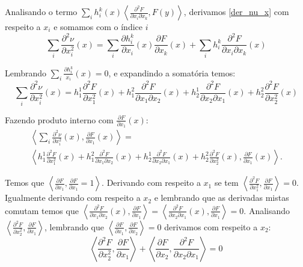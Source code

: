 \begin{demonstracao}
	Analisando o termo $\sum_i h_i^k(x) \left\langle \frac{\partial^2 F}{\partial x_i \partial x_k}, F(y) \right\rangle$, derivamos \ref{der_nu_x} com respeito a $x_i$ e somamos com o índice $i$
	\begin{equation*}
		\sum_i \frac{\partial^2 \nu}{\partial x_i^2}(x) = \sum_i \frac{\partial h_i^k}{\partial x_i}(x) \frac{\partial F}{\partial x_k}(x) + \sum_i h_i^k \frac{\partial^2 F}{\partial x_i \partial x_k}(x)
	\end{equation*}
	
	Lembrando $\sum_i \frac{\partial h_i^k}{x_i}(x) = 0$, e expandindo a somatória  temos:
	\begin{equation*}
		\sum_i \frac{\partial^2 \nu}{\partial x_i^2}(x) =  h_1^1 \frac{\partial^2 F}{\partial x_1^2}(x) + h_1^2 \frac{\partial^2 F}{\partial x_1 \partial x_2}(x) + h_2^1 \frac{\partial^2 F}{\partial x_2 \partial x_1}(x) + h_2^2 \frac{\partial^2 F}{\partial x_2^2}(x)
	\end{equation*}
	
	Fazendo produto interno com $\frac{\partial F}{\partial x_1}(x)$:
	\begin{multline*}
		\left\langle \sum_i \frac{\partial^2 \nu}{\partial x_i^2}(x), \frac{\partial F}{\partial x_1}(x) \right\rangle =\\
		\left\langle h_1^1 \frac{\partial^2 F}{\partial x_1^2}(x) + h_1^2 \frac{\partial^2 F}{\partial x_1 \partial x_2}(x) + h_2^1 \frac{\partial^2 F}{\partial x_2 \partial x_1}(x) + h_2^2 \frac{\partial^2 F}{\partial x_2^2}(x), \frac{\partial F}{\partial x_1}(x) \right\rangle.
	\end{multline*}
	
	Temos que $\left\langle \frac{\partial F}{\partial x_1}, \frac{\partial F}{\partial x_1} = 1 \right\rangle$. Derivando com respeito a $x_1$ se tem $\left\langle \frac{\partial^2 F}{\partial x_1^2}, \frac{\partial F}{\partial x_1} \right\rangle = 0$. Igualmente derivando com respeito a $x_2$ e lembrando que as derivadas mistas comutam temos que $\left\langle \frac{\partial^2 F}{\partial x_1 \partial x_2}(x), \frac{\partial F}{\partial x_1} \right\rangle = \left\langle \frac{\partial^2 F}{\partial x_2 \partial x_1}(x), \frac{\partial F}{\partial x_1} \right\rangle = 0$. Analisando $\left\langle \frac{\partial^2 F}{\partial x_2^2}, \frac{\partial F}{\partial x_1} \right\rangle$, lembrando que $\left\langle \frac{\partial F}{\partial x_1}, \frac{\partial F}{\partial x_2} \right\rangle = 0$ derivamos com respeito a $x_2$:
	\begin{equation*}
		\left\langle \frac{\partial^2 F}{\partial x_2^2}, \frac{\partial F}{\partial x_1} \right\rangle + \left\langle \frac{\partial F}{\partial x_2}, \frac{\partial^2 F}{\partial x_2 \partial x_1} \right\rangle = 0
	\end{equation*}
	

\end{demonstracao}
